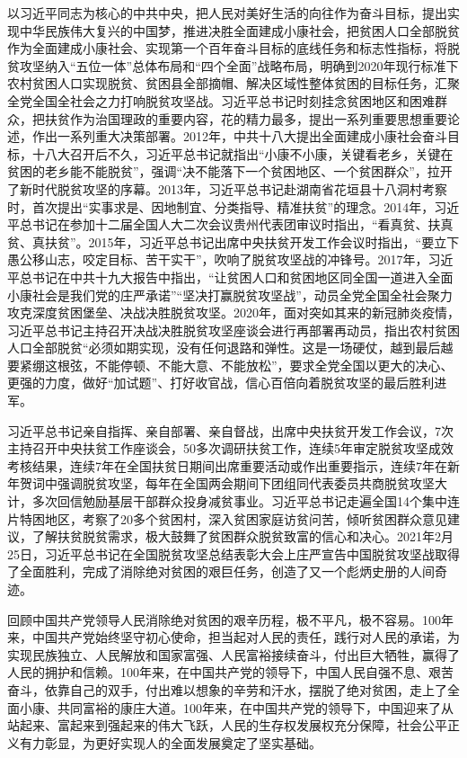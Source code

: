 \documentclass{ctexart}
\begin{document}
以习近平同志为核心的中共中央，把人民对美好生活的向往作为奋斗目标，提出实现中华民族伟大复兴的中国梦，推进决胜全面建成小康社会，把贫困人口全部脱贫作为全面建成小康社会、实现第一个百年奋斗目标的底线任务和标志性指标，将脱贫攻坚纳入“五位一体”总体布局和“四个全面”战略布局，明确到2020年现行标准下农村贫困人口实现脱贫、贫困县全部摘帽、解决区域性整体贫困的目标任务，汇聚全党全国全社会之力打响脱贫攻坚战。习近平总书记时刻挂念贫困地区和困难群众，把扶贫作为治国理政的重要内容，花的精力最多，提出一系列重要思想重要论述，作出一系列重大决策部署。2012年，中共十八大提出全面建成小康社会奋斗目标，十八大召开后不久，习近平总书记就指出“小康不小康，关键看老乡，关键在贫困的老乡能不能脱贫”，强调“决不能落下一个贫困地区、一个贫困群众”，拉开了新时代脱贫攻坚的序幕。2013年，习近平总书记赴湖南省花垣县十八洞村考察时，首次提出“实事求是、因地制宜、分类指导、精准扶贫”的理念。2014年，习近平总书记在参加十二届全国人大二次会议贵州代表团审议时指出，“看真贫、扶真贫、真扶贫”。2015年，习近平总书记出席中央扶贫开发工作会议时指出，“要立下愚公移山志，咬定目标、苦干实干”，吹响了脱贫攻坚战的冲锋号。2017年，习近平总书记在中共十九大报告中指出，“让贫困人口和贫困地区同全国一道进入全面小康社会是我们党的庄严承诺”“坚决打赢脱贫攻坚战”，动员全党全国全社会聚力攻克深度贫困堡垒、决战决胜脱贫攻坚。2020年，面对突如其来的新冠肺炎疫情，习近平总书记主持召开决战决胜脱贫攻坚座谈会进行再部署再动员，指出农村贫困人口全部脱贫“必须如期实现，没有任何退路和弹性。这是一场硬仗，越到最后越要紧绷这根弦，不能停顿、不能大意、不能放松”，要求全党全国以更大的决心、更强的力度，做好“加试题”、打好收官战，信心百倍向着脱贫攻坚的最后胜利进军。

习近平总书记亲自指挥、亲自部署、亲自督战，出席中央扶贫开发工作会议，7次主持召开中央扶贫工作座谈会，50多次调研扶贫工作，连续5年审定脱贫攻坚成效考核结果，连续7年在全国扶贫日期间出席重要活动或作出重要指示，连续7年在新年贺词中强调脱贫攻坚，每年在全国两会期间下团组同代表委员共商脱贫攻坚大计，多次回信勉励基层干部群众投身减贫事业。习近平总书记走遍全国14个集中连片特困地区，考察了20多个贫困村，深入贫困家庭访贫问苦，倾听贫困群众意见建议，了解扶贫脱贫需求，极大鼓舞了贫困群众脱贫致富的信心和决心。2021年2月25日，习近平总书记在全国脱贫攻坚总结表彰大会上庄严宣告中国脱贫攻坚战取得了全面胜利，完成了消除绝对贫困的艰巨任务，创造了又一个彪炳史册的人间奇迹。

回顾中国共产党领导人民消除绝对贫困的艰辛历程，极不平凡，极不容易。100年来，中国共产党始终坚守初心使命，担当起对人民的责任，践行对人民的承诺，为实现民族独立、人民解放和国家富强、人民富裕接续奋斗，付出巨大牺牲，赢得了人民的拥护和信赖。100年来，在中国共产党的领导下，中国人民自强不息、艰苦奋斗，依靠自己的双手，付出难以想象的辛劳和汗水，摆脱了绝对贫困，走上了全面小康、共同富裕的康庄大道。100年来，在中国共产党的领导下，中国迎来了从站起来、富起来到强起来的伟大飞跃，人民的生存权发展权充分保障，社会公平正义有力彰显，为更好实现人的全面发展奠定了坚实基础。
\end{document}
